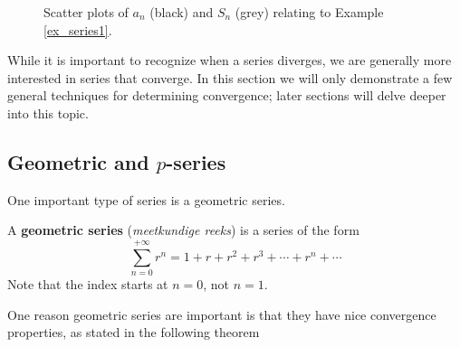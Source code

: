 \begin{example}
\begin{enumerate}
\end{enumerate}

\begin{figure}[H]
\centering
\qquad
{}
\caption{Scatter plots of $a_n$ (black) and $S_n$ (grey) relating to Example \ref{ex_series1}.}
\end{figure}

\end{example}

While it is important to recognize when a series diverges, we are generally more interested in series that  converge. In this section we will only demonstrate a few general techniques for determining convergence; later sections will delve deeper into this topic. 


\subsection{Geometric and $p$-series}
One important type of series is a geometric series.

\begin{definition}\label{def:geom_series}
A \textbf{geometric series} (\textit{meetkundige reeks}) is a series of the form 
$$\sum_{n=0}^{+\infty} r^n = 1+r+r^2+r^3+\cdots+r^n+\cdots$$
Note that the index starts at $n=0$, not $n=1$.%
\end{definition}

 One reason geometric series are important is that they have nice convergence properties, as stated in the following theorem


